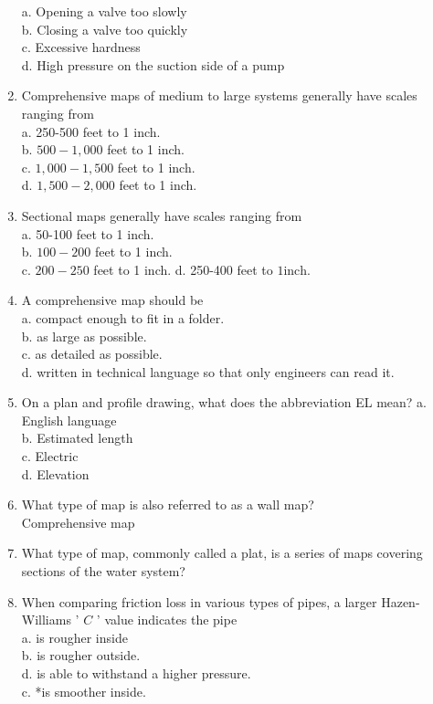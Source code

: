 \begin{enumerate}[1.]
a. Opening a valve too slowly\\
b. Closing a valve too quickly\\
c. Excessive hardness\\
d. High pressure on the suction side of a pump\\
\item Comprehensive maps of medium to large systems generally have scales ranging from\\
a. 250-500 feet to 1 inch.\\
b. $500-1,000$ feet to 1 inch.\\
c. $1,000-1,500$ feet to 1 inch.\\
d. $1,500-2,000$ feet to 1 inch.\\
\item Sectional maps generally have scales ranging from\\
a. 50-100 feet to 1 inch.\\
b. $100-200$ feet to 1 inch.\\
c. $200-250$ feet to 1 inch. d. 250-400 feet to $1 \mathrm{inch}$.\\
\item A comprehensive map should be\\
a. compact enough to fit in a folder.\\
b. as large as possible.\\
c. as detailed as possible.\\
d. written in technical language so that only engineers can read it.\\
\item On a plan and profile drawing, what does the abbreviation EL mean? a. English language\\
b. Estimated length\\
c. Electric\\
d. Elevation\\
\item What type of map is also referred to as a wall map?\\
Comprehensive map\\




\item What type of map, commonly called a plat, is a series of maps covering sections of the water system?\\

\item When comparing friction loss in various types of pipes, a larger Hazen-Williams ' $C$ ' value indicates the pipe\\
a. is rougher inside\\
b. is rougher outside.\\
d. is able to withstand a higher pressure.\\
c. *is smoother inside.\\


\end{enumerate}

